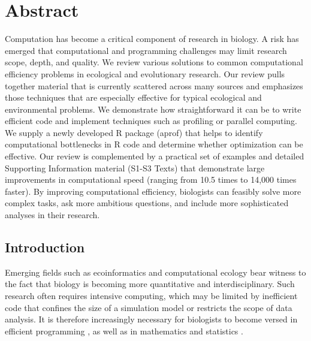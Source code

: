 \documentclass[b5paper,justified]{tufte-book} %
\begin{document}
\section{Abstract} 
\begin{fullwidth}
Computation has become a critical component of research in biology. A risk has emerged that computational and programming challenges may limit research scope, depth, and quality. We review various solutions to common computational efficiency problems in ecological and evolutionary research. Our review pulls together material that is currently scattered across many sources and emphasizes those techniques that are especially effective for typical ecological and environmental problems. We demonstrate how straightforward it can be to write efficient code and implement techniques such as profiling or parallel computing. We supply a newly developed R package (aprof) that helps to identify computational bottlenecks in R code and determine whether optimization can be effective. Our review is complemented by a practical set of examples and detailed Supporting Information material (S1-S3 Texts) that demonstrate large improvements in computational speed (ranging from 10.5 times to 14,000 times faster). By improving computational efficiency, biologists can feasibly solve more complex tasks, ask more ambitious questions, and include more sophisticated analyses in their research.

\subsection{Introduction}
Emerging fields such as ecoinformatics and computational ecology \citep{Petrovskii2012,Michener2012} bear witness to the fact that biology is becoming more quantitative and interdisciplinary. Such research often requires intensive computing, which may be limited by inefficient code that confines the size of a simulation model or restricts the scope of data analysis. It is therefore increasingly necessary for biologists to become versed in efficient programming \citep{Wilson2012}, as well as in mathematics and statistics \citep{Ellison2010}.


\end{fullwidth}
\end{document}
